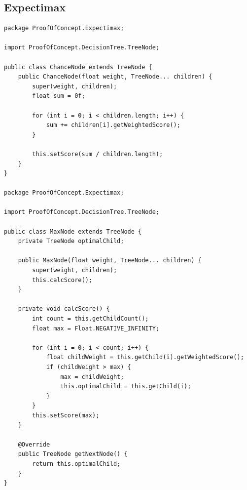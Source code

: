 \documentclass{article}
\begin{document}
\subsection{Expectimax}
\label{subsubsec:expecti}
\begin{verbatim}
package ProofOfConcept.Expectimax;

import ProofOfConcept.DecisionTree.TreeNode;

public class ChanceNode extends TreeNode {
    public ChanceNode(float weight, TreeNode... children) {
        super(weight, children);
        float sum = 0f;

        for (int i = 0; i < children.length; i++) {
            sum += children[i].getWeightedScore();
        }

        this.setScore(sum / children.length);
    }
}

package ProofOfConcept.Expectimax;

import ProofOfConcept.DecisionTree.TreeNode;

public class MaxNode extends TreeNode {
    private TreeNode optimalChild;

    public MaxNode(float weight, TreeNode... children) {
        super(weight, children);
        this.calcScore();
    }

    private void calcScore() {
        int count = this.getChildCount();
        float max = Float.NEGATIVE_INFINITY;

        for (int i = 0; i < count; i++) {
            float childWeight = this.getChild(i).getWeightedScore();
            if (childWeight > max) {
                max = childWeight;
                this.optimalChild = this.getChild(i);
            }
        }
        this.setScore(max);
    }

    @Override
    public TreeNode getNextNode() {
        return this.optimalChild;
    }
}

\end{verbatim}
\end{document}
